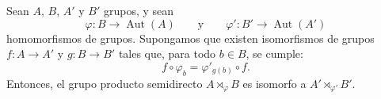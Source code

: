 		


\begin{proposicion}\label{prop:isomorfismo_semi}
	\upshape
	Sean \( A \), \( B \), \( A' \) y \( B' \) grupos, y sean $$ \varphi \colon B \to \operatorname{Aut}(A) \qquad \text{y}\qquad\varphi' \colon B' \to \operatorname{Aut}(A') $$ homomorfismos de grupos. Supongamos que existen isomorfismos de grupos \( f \colon A \to A' \) y \( g \colon B \to B' \) tales que, para todo \( b \in B \), se cumple:
	\[
	f \circ \varphi_b = \varphi'_{g(b)} \circ f.
	\]
	Entonces, el grupo producto semidirecto \( A \rtimes_\varphi B \) es isomorfo a \( A' \rtimes_{\varphi'} B' \).
\end{proposicion}

